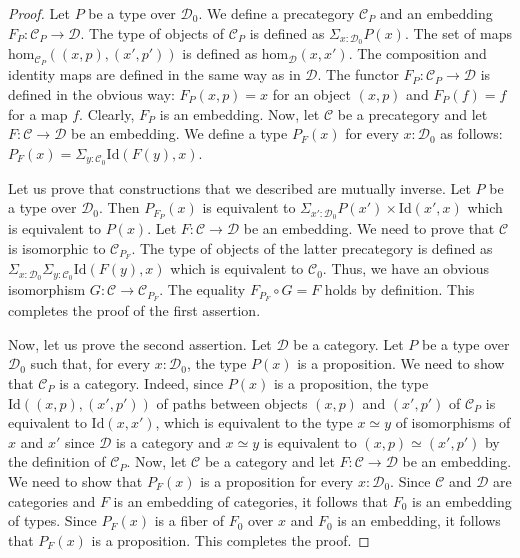 \documentclass[reqno]{amsart}
\theoremstyle{definition}
\theoremstyle{remark}
\newcommand{\fs}[1]{\mathrm{#1}}
\newcommand{\scat}[1]{\mathcal{#1}}
\renewcommand{\hom}{\fs{hom}}
\newcommand{\Id}{\fs{Id}}
\newcommand{\ob}[1]{#1_0}
\newcommand{\fob}[1]{#1_0}
\numberwithin{figure}{section}
\begin{document}
\begin{proof}
Let $P$ be a type over $\ob{\scat{D}}$.
We define a precategory $\scat{C}_P$ and an embedding $F_P : \scat{C}_P \to \scat{D}$.
The type of objects of $\scat{C}_P$ is defined as $\Sigma_{x : \ob{\scat{D}}} P(x)$.
The set of maps $\hom_{\scat{C}_P}((x,p),(x',p'))$ is defined as $\hom_\scat{D}(x,x')$.
The composition and identity maps are defined in the same way as in $\scat{D}$.
The functor $F_P : \scat{C}_P \to \scat{D}$ is defined in the obvious way: $F_P(x,p) = x$ for an object $(x,p)$ and $F_P(f) = f$ for a map $f$.
Clearly, $F_P$ is an embedding.
Now, let $\scat{C}$ be a precategory and let $F : \scat{C} \to \scat{D}$ be an embedding.
We define a type $P_F(x)$ for every $x : \ob{\scat{D}}$ as follows: $P_F(x) = \Sigma_{y : \ob{\scat{C}}} \Id(F(y),x)$.

Let us prove that constructions that we described are mutually inverse.
Let $P$ be a type over $\ob{\scat{D}}$.
Then $P_{F_P}(x)$ is equivalent to $\Sigma_{x' : \ob{\scat{D}}} P(x') \times \Id(x',x)$ which is equivalent to $P(x)$.
Let $F : \scat{C} \to \scat{D}$ be an embedding.
We need to prove that $\scat{C}$ is isomorphic to $\scat{C}_{P_F}$.
The type of objects of the latter precategory is defined as $\Sigma_{x : \ob{\scat{D}}} \Sigma_{y : \ob{\scat{C}}} \Id(F(y),x)$ which is equivalent to $\ob{\scat{C}}$.
Thus, we have an obvious isomorphism $G : \scat{C} \to \scat{C}_{P_F}$.
The equality $F_{P_F} \circ G = F$ holds by definition.
This completes the proof of the first assertion.

Now, let us prove the second assertion.
Let $\scat{D}$ be a category.
Let $P$ be a type over $\ob{\scat{D}}$ such that, for every $x : \ob{\scat{D}}$, the type $P(x)$ is a proposition.
We need to show that $\scat{C}_P$ is a category.
Indeed, since $P(x)$ is a proposition, the type $\Id((x,p),(x',p'))$ of paths between objects $(x,p)$ and $(x',p')$ of $\scat{C}_P$ is equivalent to $\Id(x,x')$,
which is equivalent to the type $x \simeq y$ of isomorphisms of $x$ and $x'$ since $\scat{D}$ is a category and $x \simeq y$ is equivalent to $(x,p) \simeq (x',p')$ by the definition of $\scat{C}_P$.
Now, let $\scat{C}$ be a category and let $F : \scat{C} \to \scat{D}$ be an embedding.
We need to show that $P_F(x)$ is a proposition for every $x : \ob{\scat{D}}$.
Since $\scat{C}$ and $\scat{D}$ are categories and $F$ is an embedding of categories, it follows that $\fob{F}$ is an embedding of types.
Since $P_F(x)$ is a fiber of $\fob{F}$ over $x$ and $\fob{F}$ is an embedding, it follows that $P_F(x)$ is a proposition.
This completes the proof.
\end{proof}
\end{document}
